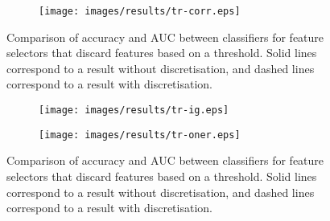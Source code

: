 \begin{figure}[htbp]
\begin{subfigure}{\textwidth}
\texttt{[image: images/results/tr-corr.eps]}
\caption{}
\label{fig:tr-threshold-corr}
\end{subfigure}
\caption{Comparison of accuracy and AUC between classifiers for feature selectors that discard features based on a threshold. Solid lines correspond to a result without discretisation, and dashed lines correspond to a result with discretisation.}
\label{fig:tr-threshold}
\end{figure}

\begin{figure}[htbp]
\ContinuedFloat
\begin{subfigure}{\textwidth}
\texttt{[image: images/results/tr-ig.eps]}
\caption{}
\label{fig:tr-threshold-ig}
\end{subfigure}

\begin{subfigure}{\textwidth}
\texttt{[image: images/results/tr-oner.eps]}
\caption{}
\label{fig:tr-threshold-oner}
\end{subfigure}
\caption{Comparison of accuracy and AUC between classifiers for feature selectors that discard features based on a threshold. Solid lines correspond to a result without discretisation, and dashed lines correspond to a result with discretisation.}
\end{figure}

